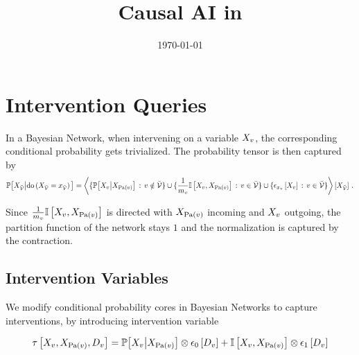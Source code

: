\documentclass[aps,onecolumn,nofootinbib,pra]{article}
\newcommand{\doof}[1]{\mathrm{do}\left(#1\right)}
\newcommand{\dovariable}{D}
\newcommand{\dovariableof}[1]{\dovariable_{#1}}
\begin{document}
    \title{Causal AI in \tnreason{}}

    \maketitle
    \date{\today}


    \section{Intervention Queries}

    In a Bayesian Network, when intervening on a variable $X_{v}$, the corresponding conditional probability gets trivialized.
    The probability tensor is then captured by
    \begin{align*}
        \condprobat{\catvariableof{\secnodes}}{\doof{\indexedcatvariableof{\thirdnodes}}}
        = \contractionof{
            \{\condprobof{\catvariableof{\node}}{\catvariableof{\parentsof{\node}}} \,:\, \node\notin\thirdnodes \}
            \cup \{\frac{1}{\catdimof{\node}} \onesat{\catvariableof{\node},\catvariableof{\parentsof{\node}}} \,:\, \node\in\thirdnodes\}
            \cup \{\onehotmapofat{\catindexof{\node}}{\catvariableof{\node}} \,:\, \node\in\thirdnodes\}
        }{\catvariableof{\secnodes}} \, .
    \end{align*}

    Since $\frac{1}{m_{v}} \mathbb{I}\left[X_{v},X_{\mathrm{Pa}(v)}\right]$ is directed with $X_{\mathrm{Pa}(v)}$ incoming and $X_{v}$ outgoing, the partition function of the network stays $1$ and the normalization is captured by the contraction.

    \subsection{Intervention Variables}

    We modify conditional probability cores in Bayesian Networks to capture interventions, by introducing intervention variable

    \begin{align*}
        \hypercoreat{\catvariableof{\node},\catvariableof{\parentsof{\node}},\dovariableof{\node}}
        = \condprobat{\catvariableof{\node}}{\catvariableof{\parentsof{\node}}} \otimes \onehotmapofat{0}{\dovariableof{\node}}
        + \onesat{\catvariableof{\node},\catvariableof{\parentsof{\node}}} \otimes \tbasisat{\dovariableof{\node}}
    \end{align*}
\end{document}
